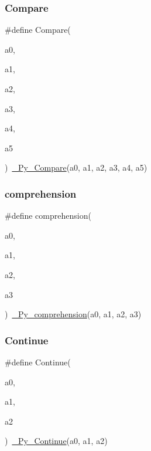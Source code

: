 \subsubsection{\texorpdfstring{Compare}{Compare}}
{\footnotesize\ttfamily \#define Compare(\begin{DoxyParamCaption}\item[{}]{a0,  }\item[{}]{a1,  }\item[{}]{a2,  }\item[{}]{a3,  }\item[{}]{a4,  }\item[{}]{a5 }\end{DoxyParamCaption})~\mbox{\hyperlink{_python-ast_8h_a2b463e29d526a83d1854ded8b88e9d7b}{\+\_\+\+Py\+\_\+\+Compare}}(a0, a1, a2, a3, a4, a5)}

\mbox{\label{_python-ast_8h_a7a5e47c28a079b103d1e2fee3c2be08e}} 
\subsubsection{\texorpdfstring{comprehension}{comprehension}}
{\footnotesize\ttfamily \#define comprehension(\begin{DoxyParamCaption}\item[{}]{a0,  }\item[{}]{a1,  }\item[{}]{a2,  }\item[{}]{a3 }\end{DoxyParamCaption})~\mbox{\hyperlink{_python-ast_8h_a749cdb84b4a563d8059c4b33df52c791}{\+\_\+\+Py\+\_\+comprehension}}(a0, a1, a2, a3)}

\mbox{\label{_python-ast_8h_a1c690eb0347cce446137935dc279a7f3}} 
\subsubsection{\texorpdfstring{Continue}{Continue}}
{\footnotesize\ttfamily \#define Continue(\begin{DoxyParamCaption}\item[{}]{a0,  }\item[{}]{a1,  }\item[{}]{a2 }\end{DoxyParamCaption})~\mbox{\hyperlink{_python-ast_8h_a135a80565203c375f54525ca9b46bbc8}{\+\_\+\+Py\+\_\+\+Continue}}(a0, a1, a2)}

